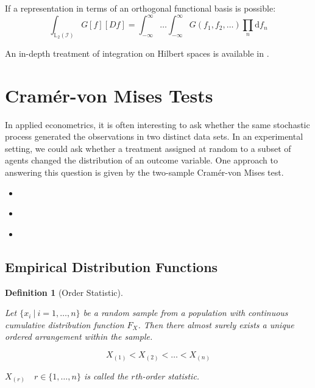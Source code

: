 \documentclass[12pt, a4paper]{article}
\theoremstyle{MAstyle} \newtheorem{assumption}{Assumption}[section]
\theoremstyle{MAstyle} \newtheorem{definition}{Definition}[section]
\theoremstyle{MAstyle} \newtheorem{theorem}{Theorem}[section]
\begin{document}
			If a representation in terms of an orthogonal functional basis is possible:
			\begin{equation}
				\int_{\mathbb{L}_2(\mathcal{I})} G\left[f\right] \left[Df\right] = \int_{-\infty}^{\infty}\dots\int_{-\infty}^{\infty} G\left(f_1, f_2, \dots\right) \prod_{n} \mathrm{d}f_n
			\end{equation}
		
			An in-depth treatment of integration on Hilbert spaces is available in \cite{skorohod_integration_1974}.
		
	\section{Cram\'{e}r-von Mises Tests}\label{CvM_Tests}
		In applied econometrics, it is often interesting to ask whether the same stochastic process generated the observations in two distinct data sets. In an experimental setting, we could ask whether a treatment assigned at random to a subset of agents changed the distribution of an outcome variable. 
		One approach to answering this question is given by the two-sample Cram\'{e}r-von Mises test.
		
		\begin{itemize}
			\item \cite{darling_kolmogorov-smirnov_1957}
			\item \cite{anderson_asymptotic_1952}
			\item \cite{buning_nichtparametrische_2013}
		\end{itemize}
	
		\subsection{Empirical Distribution Functions}
			
			\cite{gibbons_nonparametric_2021}
			\begin{definition}[Order Statistic]\label{Order_Stat}
				
				Let $\{x_i \: \vert \: i = 1, \dots , n\}$ be a random sample from a population with continuous cumulative distribution function $F_X$. Then there almost surely exists a unique ordered arrangement within the sample. 
				
				$$X_{(1)} < X_{(2)} < \dots < X_{(n)}$$
				
				$X_{(r)} \quad r \in \{1, \dots, n\}$ is called the $r$th-order statistic.	
			\end{definition}
		
\end{document}
